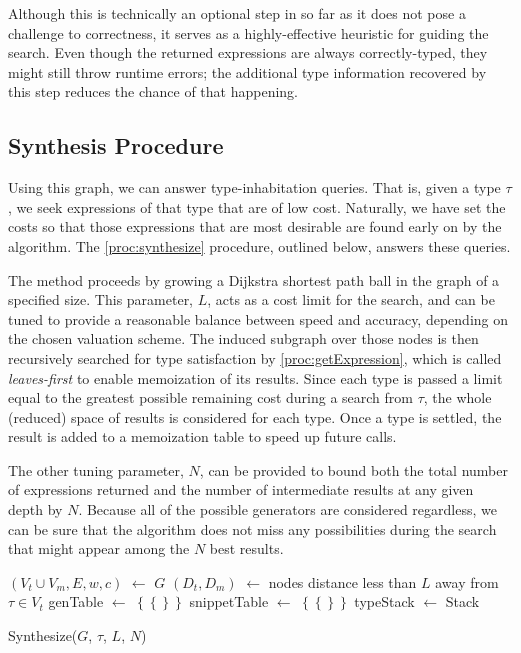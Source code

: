 Although this is technically an optional step in so far as it does not pose a challenge to correctness, it serves as a highly-effective heuristic for guiding the search. Even though the returned expressions are always correctly-typed, they might still throw runtime errors; the additional type information recovered by this step reduces the chance of that happening.

\subsection{Synthesis Procedure}

Using this graph, we can answer type-inhabitation queries. That is, given a type $\tau$, we seek expressions of that type that are of low cost. Naturally, we have set the costs so that those expressions that are most desirable are found early on by the algorithm. The \ref{proc:synthesize} procedure, outlined below, answers these queries.

The method proceeds by growing a Dijkstra shortest path ball in the graph of a specified size. This parameter, $L$, acts as a cost limit for the search, and can be tuned to provide a reasonable balance between speed and accuracy, depending on the chosen valuation scheme. The induced subgraph over those nodes is then recursively searched for type satisfaction by \ref{proc:getExpression}, which is called \textit{leaves-first} to enable memoization of its results. Since each type is passed a limit equal to the greatest possible remaining cost during a search from $\tau$, the whole (reduced) space of results is considered for each type. Once a type is settled, the result is added to a memoization table to speed up future calls.

The other tuning parameter, $N$, can be provided to bound both the total number of expressions returned and the number of intermediate results at any given depth by $N$. Because all of the possible generators are considered regardless, we can be sure that the algorithm does not miss any possibilities during the search that might appear among the $N$ best results.

\begin{procedure}
$(V_t\cup V_m, E, w, c)$ $\leftarrow$ $G$ \;
$(D_t, D_m)$ $\leftarrow$ nodes distance less than $L$ away from $\tau\in V_t$\;
genTable $\leftarrow$ $\left\{\left\{\right\}\right\}$ \;
snippetTable $\leftarrow$ $\left\{\left\{\right\}\right\}$ \;
typeStack $\leftarrow$ \KwNew Stack\;
\;
\caption{Synthesize($G$, $\tau$, $L$, $N$)}\label{proc:synthesize}
\end{procedure}

